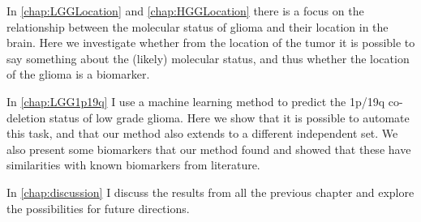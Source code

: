 In \cref{chap:LGGLocation} and \cref{chap:HGGLocation} there is a focus on the relationship between the molecular status of glioma and their location in the brain.
Here we investigate whether from the location of the tumor it is possible to say something about the (likely) molecular status, and thus whether the location of the glioma is a biomarker.

In \cref{chap:LGG1p19q} I use a machine learning method to predict the 1p/19q co-deletion status of low grade glioma.
Here we show that it is possible to automate this task, and that our method also extends to a different independent set.
We also present some biomarkers that our method found and showed that these have similarities with known biomarkers from literature.

In \cref{chap:discussion} I discuss the results from all the previous chapter and explore the possibilities for future directions.


